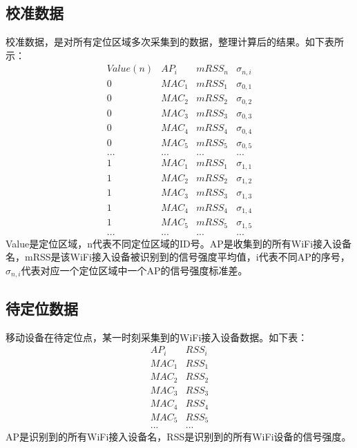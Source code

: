 \documentclass[a4paper, UTF8, twocolumn ]{ctexart}
\begin{document}
\subsection{校准数据}
校准数据，是对所有定位区域多次采集到的数据，整理计算后的结果。如下表所示：
\begin{equation}
  \begin{array}{c|c|c|c}
    Value(n) & AP_{i} & mRSS_{n} & \sigma_{n,i} \\
    \hline
    0 & MAC_{1} & mRSS_{1} & \sigma_{0,1} \\
    0 & MAC_{2} & mRSS_{2} & \sigma_{0,2} \\
    0 & MAC_{3} & mRSS_{3} & \sigma_{0,3} \\
    0 & MAC_{4} & mRSS_{4} & \sigma_{0,4} \\
    0 & MAC_{5} & mRSS_{5} & \sigma_{0,5} \\
    ... & ... & ... & ...\\
    1 & MAC_{1} & mRSS_{1} & \sigma_{1,1} \\
    1 & MAC_{2} & mRSS_{2} & \sigma_{1,2} \\
    1 & MAC_{3} & mRSS_{3} & \sigma_{1,3} \\
    1 & MAC_{4} & mRSS_{4} & \sigma_{1,4} \\
    1 & MAC_{5} & mRSS_{5} & \sigma_{1,5} \\
    ... & ... & ... & ...
  \end{array}
\end{equation}
Value是定位区域，n代表不同定位区域的ID号。AP是收集到的所有WiFi接入设备名，mRSS是该WiFi接入设备被识别到的信号强度平均值，i代表不同AP的序号，$\sigma_{n,i}$代表对应一个定位区域中一个AP的信号强度标准差。
\subsection{待定位数据}
移动设备在待定位点，某一时刻采集到的WiFi接入设备数据。如下表：
\begin{equation}
  \begin{array}{c|c}
    AP_{i} & RSS_{i}\\
    \hline
    MAC_{1} & RSS_{1}\\
    MAC_{2} & RSS_{2}\\
    MAC_{3} & RSS_{3}\\
    MAC_{4} & RSS_{4}\\
    MAC_{5} & RSS_{5}\\
    ... & ...
  \end{array}
\end{equation}
AP是识别到的所有WiFi接入设备名，RSS是识别到的所有WiFi设备的信号强度。
\end{document}
